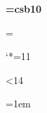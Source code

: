 \font\bf=csb10
\let\em=\it
\let\web=\tt
\let\sc=\scfnt
\let\obrtab=\bf

\def\hvezd{\ifmmode *\else $*$\fi}
\def\slunce{\ifmmode \odot\else $\odot$\fi}
\def\zeme{\ifmmode \oplus\else $\oplus$\fi}

\def\smallfonts{%
  \textfont0=\rmlg \scriptfont0=\rms \scriptscriptfont1=\rmss%
  \textfont1=\mthlg \scriptfont1=\mths \scriptscriptfont1=\mthss%
  \textfont2=\symlg \scriptfont2=\syms \scriptscriptfont2=\symss%
%
  \ifnum\extrafonts=1%
    \textfont\vefam=\eightve \scriptfont\vefam=\sixve \scriptscriptfont\vefam=\fiveve%
    \def\mugr{\mathchoice{\hbox{\eightgr m}}{\hbox{\eightgr m}}{\hbox{\sixgr m}}{\hbox{\fivegr m}}}%
    \def\pi{{\mathchoice{\hbox{\eightgr p}}{\hbox{\eightgr p}}{\hbox{\sixgr p}}{\hbox{\fivegr p}}}}%
  \fi
%
  \def\mesic{%
    {\mathchoice%
      {\hbox{\kern.02em\lower.1em \hbox{\astrosymeight\char210}}}%
      {\hbox{\kern.02em\lower.1em \hbox{\astrosymeight\char210}}}%
      {\hbox{\kern.01em\lower.1em \hbox{\astrosymseven\char210}}}%
      {\hbox{\kern.00em\lower.09em\hbox{\astrosymsix  \char210}}}%
    }%
  }%
%
  \def\rm{\fam0\rmlg}%
  \let\it=\smallitfnt%
  \let\tt=\smallttfnt%
  \let\bf=\smallbffnt%
  \let\sc=\smallscfnt%
  \let\em=\it%
  \let\web=\tt%
  \let\obrtab=\bf%
  \rm%
}

\setbox\strutbox=\hbox{\vrule height 9pt depth 3.5pt width 0pt}

\newdimen\smallbaselineskip
\smallbaselineskip=10pt
\def\smallstrut{\vrule height 7pt depth 3pt width 0pt}

\let\myphi=\varphi
\let\myrho=\varrho
\let\myepsilon=\varepsilon

\def\eur{{\eurofnt E}}
\def\jmeno#1{{\sc #1}}


\catcode`*=11
\newwrite\toc
\def\tableofcontents{%
  \pagenumbers	%
  \bigskip
  \noindent\line{{\articlefnt Obsah}\hfil strana}
  \medskip
  \softinput{\jobname.toc} 
  \immediate\openout\toc \jobname.toc
}
\def\addcontentline#1#2#3{
  \write\toc {\string\contentline{\noexpand #1}{\noexpand #2}{#3}}
}

\newcount\contentlinecnt
{}
\ifx\pdfoutput\undefined\else
  
  \ifnum\pdftexversion<14
    \let\pdfannotlink=\pdfstartlink
  \fi
\fi

\newdimen\contentnumwidth
\contentnumwidth=1em

\def\contentline#1#2#3{
  \noindent \ifx:#2:\else #2:\ \fi {\em%
  \ifx\pdfoutput\undefined%
    #1%
  \else%
    \global\advance \contentlinecnt by 1%
    \pdfstartlink attr {/Border [0 0 0]} goto num \the\contentlinecnt%
    \setcolor\cmykViolet #1\setcolor\cmykBlack\pdfendlink%
  \fi%
  } \leaders\hbox to.6em{\hfil .\hfil}\hfill\hbox to\contentnumwidth{\hfill#3}\par
  \smallskip
}

